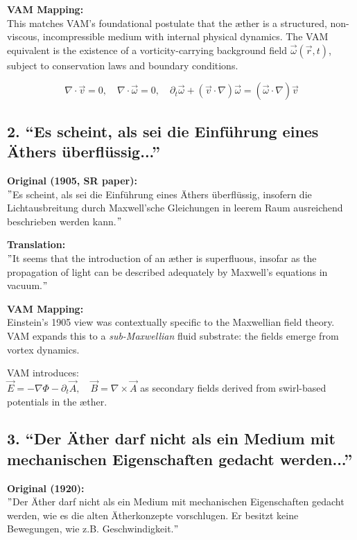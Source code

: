 \documentclass[preprint,notitlepage]{revtex4-2}
\renewcommand{\grqq}{``}
\begin{document}
    \textbf{VAM Mapping:} \\
    This matches VAM's foundational postulate that the æther is a structured, non-viscous, incompressible medium with internal physical dynamics. The VAM equivalent is the existence of a vorticity-carrying background field \( \vec{\omega}(\vec{r}, t) \), subject to conservation laws and boundary conditions.

    \[
    \nabla \cdot \vec{v} = 0, \quad \nabla \cdot \vec{\omega} = 0, \quad \partial_t \vec{\omega} + (\vec{v} \cdot \nabla) \vec{\omega} = (\vec{\omega} \cdot \nabla) \vec{v}
    \]

    \subsection*{2. \grqq Es scheint, als sei die Einführung eines Äthers überflüssig...\textquotedblright}
    \textbf{Original (1905, SR paper):} \\
    \("\)Es scheint, als sei die Einführung eines Äthers überflüssig, insofern die Lichtausbreitung durch Maxwell'sche Gleichungen in leerem Raum ausreichend beschrieben werden kann.\("\)

    \textbf{Translation:} \\
    \("\)It seems that the introduction of an æther is superfluous, insofar as the propagation of light can be described adequately by Maxwell's equations in vacuum.\("\)

    \textbf{VAM Mapping:} \\
    Einstein's 1905 view was contextually specific to the Maxwellian field theory. VAM expands this to a \emph{sub-Maxwellian} fluid substrate: the fields emerge from vortex dynamics.

    VAM introduces: \\
    \( \vec{E} = -\nabla \Phi - \partial_t \vec{A}, \quad \vec{B} = \nabla \times \vec{A} \) as secondary fields derived from swirl-based potentials in the æther.

    \subsection*{3. \grqq Der Äther darf nicht als ein Medium mit mechanischen Eigenschaften gedacht werden...\textquotedblright}
    \textbf{Original (1920):} \\
    \("\)Der Äther darf nicht als ein Medium mit mechanischen Eigenschaften gedacht werden, wie es die alten Ätherkonzepte vorschlugen. Er besitzt keine Bewegungen, wie z.B. Geschwindigkeit.\("\)
\end{document}
